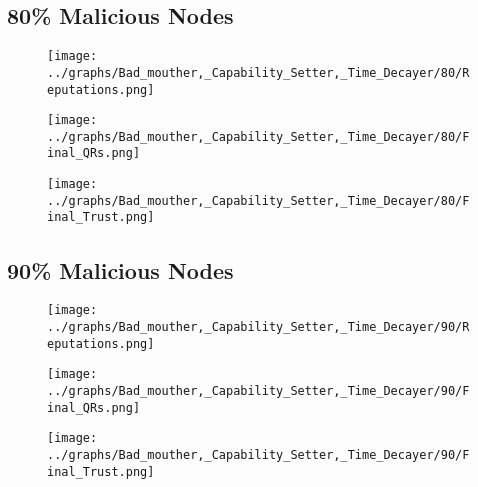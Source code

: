 \documentclass{article}
\begin{document}
  \begin{minipage}[t]{0.49\columnwidth}
    \subsection*{80\% Malicious Nodes}
        \begin{figure}[H]
            \centering
            \texttt{[image: ../graphs/Bad\_mouther,\_Capability\_Setter,\_Time\_Decayer/80/Reputations.png]}
        \end{figure}
        \begin{figure}[H]
            \centering
            \texttt{[image: ../graphs/Bad\_mouther,\_Capability\_Setter,\_Time\_Decayer/80/Final\_QRs.png]}
        \end{figure}
    \end{minipage}
    \begin{minipage}[t]{0.49\columnwidth}
        \begin{figure}[H]
            \centering
            \texttt{[image: ../graphs/Bad\_mouther,\_Capability\_Setter,\_Time\_Decayer/80/Final\_Trust.png]}
        \end{figure}
    \end{minipage}

    \begin{minipage}[t]{0.49\columnwidth}
    \subsection*{90\% Malicious Nodes}
        \begin{figure}[H]
            \centering
            \texttt{[image: ../graphs/Bad\_mouther,\_Capability\_Setter,\_Time\_Decayer/90/Reputations.png]}
        \end{figure}
        \begin{figure}[H]
            \centering
            \texttt{[image: ../graphs/Bad\_mouther,\_Capability\_Setter,\_Time\_Decayer/90/Final\_QRs.png]}
        \end{figure}
    \end{minipage}
    \begin{minipage}[t]{0.49\columnwidth}
        \begin{figure}[H]
            \centering
            \texttt{[image: ../graphs/Bad\_mouther,\_Capability\_Setter,\_Time\_Decayer/90/Final\_Trust.png]}
        \end{figure}
    \end{minipage}
    \newpage
\end{document}
